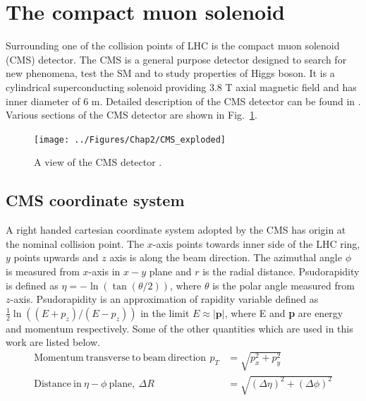 \section{The compact muon solenoid}
Surrounding one of the collision points of LHC is the compact muon solenoid (CMS) detector. The CMS is a general purpose detector designed to 
search for new phenomena, test the SM and to study properties of Higgs boson. It is a cylindrical superconducting solenoid providing 3.8 T 
axial magnetic field and has inner diameter of 6 m. Detailed description of the CMS detector can be found in \cite{Chatrchyan:2008aa}. 
Various sections of the CMS detector are shown in Fig.~\ref{fig:CMS_exploded}.
\begin{figure}[h!]
\centering
\texttt{[image: ../Figures/Chap2/CMS\_exploded]}
\caption[CMS detector view]{A view of the CMS detector \cite{Chatrchyan:2008aa}.}
\label{fig:CMS_exploded}
\end{figure}

\subsection{CMS coordinate system}
A right handed cartesian coordinate system adopted by the CMS has origin at the nominal collision point. The $x$-axis points towards inner 
side of the LHC ring, $y$ points upwards and $z$ axis is along the beam direction. The azimuthal angle $\phi$ is measured from $x$-axis in 
$x-y$ plane and $r$ is the radial distance. Psudorapidity is defined as $\eta = - \ln(\tan(\theta/2))$, where $\theta$ is the polar angle 
measured from $z$-axis. Psudorapidity is an approximation of rapidity variable defined as $\frac{1}{2}\ln((E+p_z)/(E-p_z))$ in the limit 
$E\approx |\textbf{p}|$, where E and \textbf{p} are energy and momentum respectively. Some of the other quantities which are used in this 
work are listed below.
\begin{align}
\mathrm{Momentum\ transverse\ to\ beam\ direction\,\ } p_T & = \sqrt{p_{x}^2 + p_{y}^2}\\
\mathrm{Distance\ in\ }\eta-\phi \ \mathrm{plane,}\ \Delta R & = \sqrt{(\Delta \eta)^2 + (\Delta \phi)^2}
\end{align}


